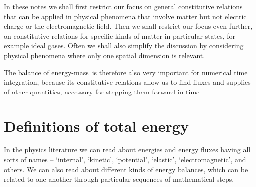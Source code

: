 \documentclass[a4paper,12pt,%
onecolumn,oneside,%
british%
]{memoir}
\renewcommand*{\|}[1][]{\nonscript\:#1\vert\nonscript\:\mathopen{}}
\newcommand*{\sect}{\S}%
\renewcommand*{\autoref}[3][\sect\,\ref]{\textcolor{blue}{#3} {\color{blue}\scriptsize(\faIcon[regular]{eye}\;#1{#2}\;p.\,\pageref{#2})}}
\newcommand*{\energym}{energy-mass}
\begin{document}
In these notes we shall first restrict our focus on general constitutive relations that can be applied in physical phenomena that involve matter but not electric charge or the electromagnetic field. Then we shall restrict our focus even further, on constitutive relations for specific kinds of matter in particular states, for example ideal gases. Often we shall also simplify the discussion by considering physical phenomena where only one spatial dimension is relevant.

The balance of \energym\ is therefore also very important for numerical time integration, because its constitutive relations allow us to find fluxes and supplies of other quantities, necessary for stepping them forward in time.

% 

\section{Definitions of total energy}
\label{sec:energy_defs}

In the physics literature we can read about energies and energy fluxes having all sorts of names -- \enquote*{internal}, \enquote*{kinetic}, \enquote*{potential}, \enquote*{elastic}, \enquote*{electromagnetic}, and others. We can also read about different kinds of energy balances, which can be related to one another through particular sequences of mathematical steps.
\end{document}
